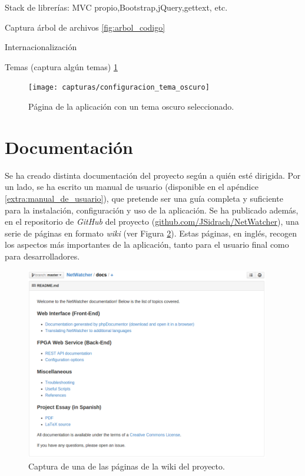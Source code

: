 Stack de librerías: MVC propio,Bootstrap,jQuery,gettext, etc.

Captura árbol de archivos \ref{fig:arbol_codigo}

Internacionalización

Temas (captura algún temas) \ref{fig:captura:oscuro}
\begin{figure}[!htp]
  \centering
  \texttt{[image: capturas/configuracion\_tema\_oscuro]}
  \caption{Página de la aplicación con un tema oscuro seleccionado.}
  \label{fig:captura:oscuro}
\end{figure}


\section{Documentación \label{sec:imp:docs}}

Se ha creado distinta documentación del proyecto según a quién esté dirigida.
Por un lado, se ha escrito un manual de usuario (disponible en el apéndice \ref{extra:manual_de_usuario}), que pretende ser una guía completa y suficiente para la instalación, configuración y uso de la aplicación.
Se ha publicado además, en el repositorio de \textit{GitHub} del proyecto (\url{github.com/JSidrach/NetWatcher}), una serie de páginas en formato \textit{wiki} (ver Figura \ref{fig:captura:wiki}). Estas páginas, en inglés, recogen los aspectos más importantes de la aplicación, tanto para el usuario final como para desarrolladores.

\begin{figure}[!htp]
  \centering
  \includegraphics[width=0.95\textwidth,clip=true]{graphics/capturas/github_docs}
  \caption{Captura de una de las páginas de la wiki del proyecto.}
  \label{fig:captura:wiki}
\end{figure} 

